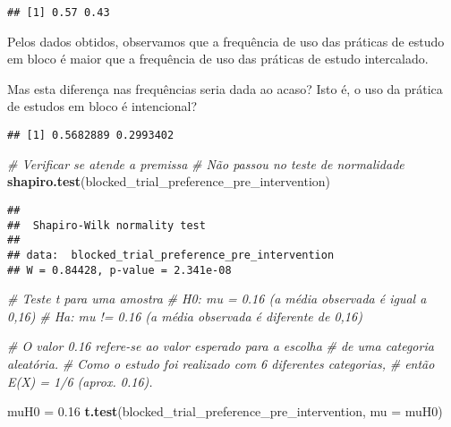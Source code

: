 \documentclass[
]{article}
\newenvironment{Shaded}{\begin{snugshade}}{\end{snugshade}}
\newcommand{\AttributeTok}[1]{\textcolor[rgb]{0.13,0.29,0.53}{#1}}
\newcommand{\CommentTok}[1]{\textcolor[rgb]{0.56,0.35,0.01}{\textit{#1}}}
\newcommand{\DecValTok}[1]{\textcolor[rgb]{0.00,0.00,0.81}{#1}}
\newcommand{\FloatTok}[1]{\textcolor[rgb]{0.00,0.00,0.81}{#1}}
\newcommand{\FunctionTok}[1]{\textcolor[rgb]{0.13,0.29,0.53}{\textbf{#1}}}
\newcommand{\NormalTok}[1]{#1}
\newcommand{\OtherTok}[1]{\textcolor[rgb]{0.56,0.35,0.01}{#1}}
\newcommand{\SpecialCharTok}[1]{\textcolor[rgb]{0.81,0.36,0.00}{\textbf{#1}}}
\newcommand{\StringTok}[1]{\textcolor[rgb]{0.31,0.60,0.02}{#1}}
\begin{document}
\begin{verbatim}
## [1] 0.57 0.43
\end{verbatim}

Pelos dados obtidos, observamos que a frequência de uso das práticas de
estudo em bloco é maior que a frequência de uso das práticas de estudo
intercalado.

Mas esta diferença nas frequências seria dada ao acaso? Isto é, o uso da
prática de estudos em bloco é intencional?

\begin{Shaded}
\end{Shaded}

\begin{verbatim}
## [1] 0.5682889 0.2993402
\end{verbatim}

\begin{Shaded}
\begin{Highlighting}[]
\CommentTok{\# Verificar se atende a premissa}
\CommentTok{\# Não passou no teste de normalidade}
\FunctionTok{shapiro.test}\NormalTok{(blocked\_trial\_preference\_pre\_intervention)}
\end{Highlighting}
\end{Shaded}

\begin{verbatim}
## 
##  Shapiro-Wilk normality test
## 
## data:  blocked_trial_preference_pre_intervention
## W = 0.84428, p-value = 2.341e-08
\end{verbatim}

\begin{Shaded}
\begin{Highlighting}[]
\CommentTok{\# Teste t para uma amostra}
\CommentTok{\# H0: mu = 0.16 (a média observada é igual a 0,16)}
\CommentTok{\# Ha: mu != 0.16 (a média observada é diferente de 0,16)}

\CommentTok{\# O valor 0.16 refere{-}se ao valor esperado para a escolha}
\CommentTok{\# de uma categoria aleatória.}
\CommentTok{\# Como o estudo foi realizado com 6 diferentes categorias,}
\CommentTok{\# então E(X) = 1/6 (aprox. 0.16).}

\NormalTok{muH0 }\OtherTok{=} \FloatTok{0.16}
\FunctionTok{t.test}\NormalTok{(blocked\_trial\_preference\_pre\_intervention, }\AttributeTok{mu =}\NormalTok{ muH0)}
\end{Highlighting}
\end{Shaded}
\end{document}
